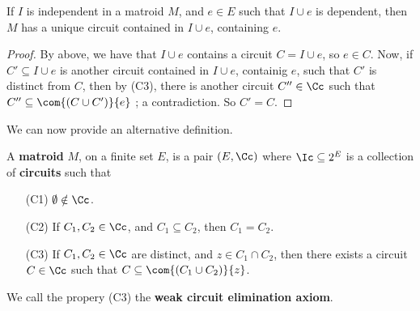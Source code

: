 \begin{corollary}
    If $I$ is independent in a matroid  $M$, and  $e \in E$ such that  $I \cup
    e$ is dependent, then  $M$ has a unique circuit contained in  $I \cup e$,
    containing  $e$.
\end{corollary}
\begin{proof}
    By above, we have that $I \cup e$ contains a circuit  $C=I \cup e$, so  $e
    \in C$. Now, if $C' \subseteq I \cup e$ is another circuit contained in  $I
    \cup e$, containig  $e$, such that $C'$ is distinct from $C$, then by (C3),
    there is another circuit $C'' \in \Cc$ such that $C'' \subseteq \com{(C \cup
    C')}{e}$ ; a contradiction. So $C'=C$.
\end{proof}

We can now provide an alternative definition.

\begin{definition}
    A \textbf{matroid} $M$, on a finite set $E$, is  a pair $(E,\Cc)$ where
    $\Ic \subseteq 2^E$ is a collection of \textbf{circuits} such that
    \begin{enumerate}
        \item[(C1)] $\emptyset \notin \Cc$.

        \item[(C2)] If $C_1, C_2 \in \Cc$, and $C_1 \subseteq C_2$, then
            $C_1=C_2$.

        \item[(C3)] If $C_1, C_2 \in \Cc$ are distinct, and $z \in C_1 \cap
            C_2$, then there exists a circuit $C \in \Cc$ such that $C \subseteq
            \com{(C_1 \cup C_2)}{z}$.
    \end{enumerate}
    We call the propery (C3) the \textbf{weak circuit elimination axiom}.
\end{definition}

